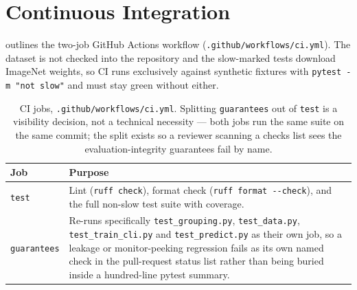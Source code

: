 \documentclass[11pt,a4paper,oneside]{report}
\newcommand{\code}[1]{\texttt{\small #1}}
\begin{document}
\section{Continuous Integration}

 outlines the two-job GitHub Actions workflow
(\texttt{.github/workflows/ci.yml}). The dataset is not checked into the
repository and the slow-marked tests download ImageNet weights, so CI runs
exclusively against synthetic fixtures with \code{pytest -m "not slow"} and
must stay green without either.

\begin{table}[h]
\centering
\small
\begin{tabularx}{\linewidth}{@{}l X@{}}
\toprule
\textbf{Job} & \textbf{Purpose} \\
\midrule
\code{test} & Lint (\code{ruff check}), format check (\code{ruff format
  -{}-check}), and the full non-slow test suite with coverage. \\
\code{guarantees} & Re-runs specifically
  \code{test\_grouping.py}, \code{test\_data.py}, \code{test\_train\_cli.py}
  and \code{test\_predict.py} as their own job, so a leakage or
  monitor-peeking regression fails as its own named check in the pull-request
  status list rather than being buried inside a hundred-line pytest summary. \\
\bottomrule
\end{tabularx}
\caption{CI jobs, \texttt{.github/workflows/ci.yml}. Splitting
\code{guarantees} out of \code{test} is a visibility decision, not a
technical necessity --- both jobs run the same suite on the same commit; the
split exists so a reviewer scanning a checks list sees the evaluation-integrity
guarantees fail by name.}
\label{tab:ci-jobs}
\end{table}
\end{document}
